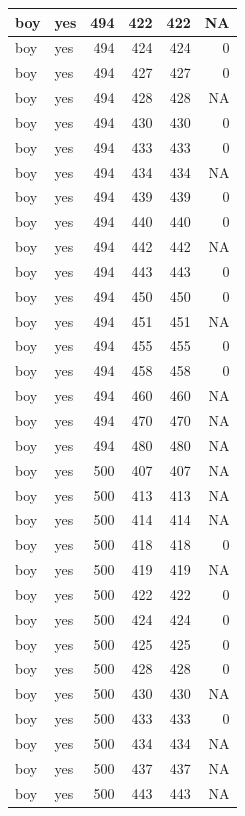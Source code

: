 \documentclass[man]{apa6}
\begin{document}
\begin{tabular}{l|l|r|r|r|r}
\hline
boy & yes & 494 & 422 & 422 & NA\\
\hline
boy & yes & 494 & 424 & 424 & 0\\
\hline
boy & yes & 494 & 427 & 427 & 0\\
\hline
boy & yes & 494 & 428 & 428 & NA\\
\hline
boy & yes & 494 & 430 & 430 & 0\\
\hline
boy & yes & 494 & 433 & 433 & 0\\
\hline
boy & yes & 494 & 434 & 434 & NA\\
\hline
boy & yes & 494 & 439 & 439 & 0\\
\hline
boy & yes & 494 & 440 & 440 & 0\\
\hline
boy & yes & 494 & 442 & 442 & NA\\
\hline
boy & yes & 494 & 443 & 443 & 0\\
\hline
boy & yes & 494 & 450 & 450 & 0\\
\hline
boy & yes & 494 & 451 & 451 & NA\\
\hline
boy & yes & 494 & 455 & 455 & 0\\
\hline
boy & yes & 494 & 458 & 458 & 0\\
\hline
boy & yes & 494 & 460 & 460 & NA\\
\hline
boy & yes & 494 & 470 & 470 & NA\\
\hline
boy & yes & 494 & 480 & 480 & NA\\
\hline
boy & yes & 500 & 407 & 407 & NA\\
\hline
boy & yes & 500 & 413 & 413 & NA\\
\hline
boy & yes & 500 & 414 & 414 & NA\\
\hline
boy & yes & 500 & 418 & 418 & 0\\
\hline
boy & yes & 500 & 419 & 419 & NA\\
\hline
boy & yes & 500 & 422 & 422 & 0\\
\hline
boy & yes & 500 & 424 & 424 & 0\\
\hline
boy & yes & 500 & 425 & 425 & 0\\
\hline
boy & yes & 500 & 428 & 428 & 0\\
\hline
boy & yes & 500 & 430 & 430 & NA\\
\hline
boy & yes & 500 & 433 & 433 & 0\\
\hline
boy & yes & 500 & 434 & 434 & NA\\
\hline
boy & yes & 500 & 437 & 437 & NA\\
\hline
boy & yes & 500 & 443 & 443 & NA\\

\end{tabular}
\end{document}
